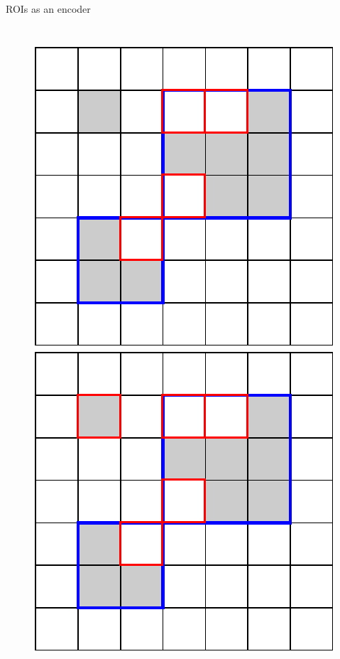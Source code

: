\documentclass[10pt]{beamer}
\begin{document}
\begin{frame}{ROIs as an encoder}
\begin{columns}[T, onlytextwidth]
\begin{figure}
\begin{overprint}
            \centering\includegraphics[scale=0.5]{figures/running-example/ILP/running-ex-ilp3.pdf}
            \centering\includegraphics[scale=0.5]{figures/running-example/ILP/running-ex-ilp4.pdf}
        \end{overprint}
    \end{figure}
\end{columns}

\end{frame}
\end{document}
